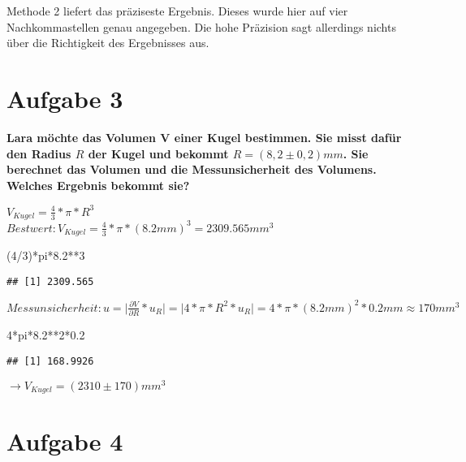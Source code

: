 \documentclass[
]{article}
\newenvironment{Shaded}{\begin{snugshade}}{\end{snugshade}}
\newcommand{\DecValTok}[1]{\textcolor[rgb]{0.00,0.00,0.81}{#1}}
\newcommand{\FloatTok}[1]{\textcolor[rgb]{0.00,0.00,0.81}{#1}}
\newcommand{\NormalTok}[1]{#1}
\newcommand{\SpecialCharTok}[1]{\textcolor[rgb]{0.00,0.00,0.00}{#1}}
\begin{document}
Methode 2 liefert das präziseste Ergebnis. Dieses wurde hier auf vier
Nachkommastellen genau angegeben. Die hohe Präzision sagt allerdings
nichts über die Richtigkeit des Ergebnisses aus.

\hypertarget{aufgabe-3}{%
\section{Aufgabe 3}\label{aufgabe-3}}

\textbf{Lara möchte das Volumen V einer Kugel bestimmen. Sie misst dafür
den Radius \(R\) der Kugel und bekommt \(R = (8,2 \pm 0,2)mm\). Sie
berechnet das Volumen und die Messunsicherheit des Volumens. Welches
Ergebnis bekommt sie?}

\(V_{Kugel}= \frac {4}{3}*\pi*R^3\)\\

\(Bestwert: V_{Kugel}= \frac {4}{3}*\pi*(8.2mm)^3=2309.565mm^3\)

\begin{Shaded}
\begin{Highlighting}[]
\NormalTok{(}\DecValTok{4}\SpecialCharTok{/}\DecValTok{3}\NormalTok{)}\SpecialCharTok{*}\NormalTok{pi}\SpecialCharTok{*}\FloatTok{8.2}\SpecialCharTok{**}\DecValTok{3}
\end{Highlighting}
\end{Shaded}

\begin{verbatim}
## [1] 2309.565
\end{verbatim}

\(Messunsicherheit:u=\vert\frac{\partial{V}}{\partial{R}}*u_R\vert=\vert4*\pi*R^2*u_R\vert= 4*\pi*(8.2mm)^2*0.2mm \approx 170mm^3\)

\begin{Shaded}
\begin{Highlighting}[]
\DecValTok{4}\SpecialCharTok{*}\NormalTok{pi}\SpecialCharTok{*}\FloatTok{8.2}\SpecialCharTok{**}\DecValTok{2}\SpecialCharTok{*}\FloatTok{0.2}
\end{Highlighting}
\end{Shaded}

\begin{verbatim}
## [1] 168.9926
\end{verbatim}

\(\rightarrow V_{Kugel}= (2310\pm 170)mm^3\)

\hypertarget{aufgabe-4}{%
\section{Aufgabe 4}\label{aufgabe-4}}
\end{document}

